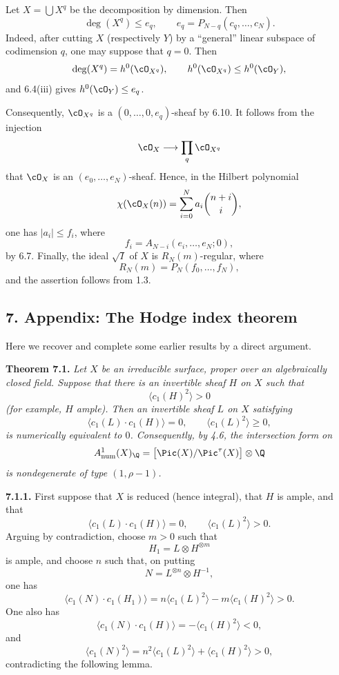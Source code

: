 Let $X=\bigcup X^q$ be the decomposition by dimension. Then
\[
  \deg(X^q)\leq e_q,
  \qquad
  e_q=P_{N-q}(c_q,\ldots,c_N).
\]
Indeed, after cutting $X$ (respectively $Y$) by a ``general'' linear subspace of codimension $q$, one may suppose that $q=0$. Then
\[
  \deg(X^q)=h^0(\cO_{X^q}),
  \qquad
  h^0(\cO_{X^q})\leq h^0(\cO_Y),
\]
and 6.4(iii) gives $h^0(\cO_Y)\leq e_q$.

Consequently, $\cO_{X^q}$ is a $(0,\ldots,0,e_q)$-sheaf by 6.10. It follows from the injection
\[
  \cO_X\longrightarrow\prod_q\cO_{X^q}
\]
that $\cO_X$ is an $(e_0,\ldots,e_N)$-sheaf. Hence, in the Hilbert polynomial
\[
  \chi(\cO_X(n))=\sum_{i=0}^{N}a_i\binom{n+i}{i},
\]
one has $|a_i|\leq f_i$, where
\[
  f_i=A_{N-i}(e_i,\ldots,e_N;0),
\]
by 6.7. Finally, the ideal $\sqrt I$ of $X$ is $R_N(m)$-regular, where
\[
  R_N(m)=P_N(f_0,\ldots,f_N),
\]
and the assertion follows from 1.3.

\subsection*{7. Appendix: The Hodge index theorem}

Here we recover and complete some earlier results by a direct argument.

\textbf{Theorem 7.1.} \emph{Let $X$ be an irreducible surface, proper over an algebraically closed field. Suppose that there is an invertible sheaf $H$ on $X$ such that
\[
  \langle c_1(H)^2\rangle>0
\]
(for example, $H$ ample). Then an invertible sheaf $L$ on $X$ satisfying
\[
  \langle c_1(L)\cdot c_1(H)\rangle=0,
  \qquad
  \langle c_1(L)^2\rangle\geq0,
\]
is numerically equivalent to $0$. Consequently, by 4.6, the intersection form on
\[
  A^1_{\mathrm{num}}(X)_{\Q}
  =\bigl[\Pic(X)/\Pic^\tau(X)\bigr]\otimes\Q
\]
is nondegenerate of type $(1,\rho-1)$.}

\textbf{7.1.1.} First suppose that $X$ is reduced (hence integral), that $H$ is ample, and that
\[
  \langle c_1(L)\cdot c_1(H)\rangle=0,
  \qquad
  \langle c_1(L)^2\rangle>0.
\]
Arguing by contradiction, choose $m>0$ such that
\[
  H_1=L\otimes H^{\otimes m}
\]
is ample, and choose $n$ such that, on putting
\[
  N=L^{\otimes n}\otimes H^{-1},
\]
one has
\[
  \langle c_1(N)\cdot c_1(H_1)\rangle
  =n\langle c_1(L)^2\rangle-m\langle c_1(H)^2\rangle>0.
\]
One also has
\[
  \langle c_1(N)\cdot c_1(H)\rangle
  =-\langle c_1(H)^2\rangle<0,
\]
and
\[
  \langle c_1(N)^2\rangle
  =n^2\langle c_1(L)^2\rangle+\langle c_1(H)^2\rangle>0,
\]
contradicting the following lemma.

